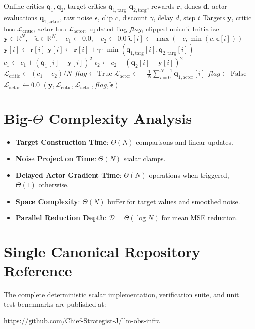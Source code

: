 \documentclass[11pt,a4paper]{article}
\theoremstyle{definition}
\begin{document}
\begin{algorithm}[H]
\caption{TD3 Clipped Double Q Evaluation and Delayed Policy Gradient}
\begin{algorithmic}[1]
\Require Online critics $\mathbf{q}_1, \mathbf{q}_2$, target critics $\mathbf{q}_{1,\text{targ}}, \mathbf{q}_{2,\text{targ}}$, rewards $\mathbf{r}$, dones $\mathbf{d}$, actor evaluations $\mathbf{q}_{1,\text{actor}}$, raw noise $\boldsymbol{\epsilon}$, clip $c$, discount $\gamma$, delay $d$, step $t$
\Ensure Targets $\mathbf{y}$, critic loss $\mathcal{L}_{\text{critic}}$, actor loss $\mathcal{L}_{\text{actor}}$, updated flag $flag$, clipped noise $\tilde{\boldsymbol{\epsilon}}$
\State Initialize $\mathbf{y} \in \mathbb{R}^N, \quad \tilde{\boldsymbol{\epsilon}} \in \mathbb{R}^N, \quad c_1 \gets 0.0, \quad c_2 \gets 0.0$
    \State $\tilde{\boldsymbol{\epsilon}}[i] \gets \max(-c, \min(c, \boldsymbol{\epsilon}[i]))$
        \State $\mathbf{y}[i] \gets \mathbf{r}[i]$
    \Else
        \State $\mathbf{y}[i] \gets \mathbf{r}[i] + \gamma \cdot \min(\mathbf{q}_{1,\text{targ}}[i], \mathbf{q}_{2,\text{targ}}[i])$
    \EndIf
    \State $c_1 \gets c_1 + (\mathbf{q}_1[i] - \mathbf{y}[i])^2$
    \State $c_2 \gets c_2 + (\mathbf{q}_2[i] - \mathbf{y}[i])^2$
\EndFor
\State $\mathcal{L}_{\text{critic}} \gets (c_1 + c_2) / N$
    \State $flag \gets \text{True}$
    \State $\mathcal{L}_{\text{actor}} \gets - \frac{1}{N}\sum_{i=0}^{N-1} \mathbf{q}_{1,\text{actor}}[i]$
\Else
    \State $flag \gets \text{False}$
    \State $\mathcal{L}_{\text{actor}} \gets 0.0$
\EndIf
\State \Return $(\mathbf{y}, \mathcal{L}_{\text{critic}}, \mathcal{L}_{\text{actor}}, flag, \tilde{\boldsymbol{\epsilon}})$
\end{algorithmic}
\end{algorithm}

\section{Big-$\Theta$ Complexity Analysis}

\begin{itemize}
    \item \textbf{Target Construction Time}: $\Theta(N)$ comparisons and linear updates.
    \item \textbf{Noise Projection Time}: $\Theta(N)$ scalar clamps.
    \item \textbf{Delayed Actor Gradient Time}: $\Theta(N)$ operations when triggered, $\Theta(1)$ otherwise.
    \item \textbf{Space Complexity}: $\Theta(N)$ buffer for target values and smoothed noise.
    \item \textbf{Parallel Reduction Depth}: $\mathcal{D} = \Theta(\log N)$ for mean MSE reduction.
\end{itemize}

\section{Single Canonical Repository Reference}

The complete deterministic scalar implementation, verification suite, and unit test benchmarks are published at:
\begin{center}
\url{https://github.com/Chief-Strategist-J/llm-obs-infra}
\end{center}
\end{document}

